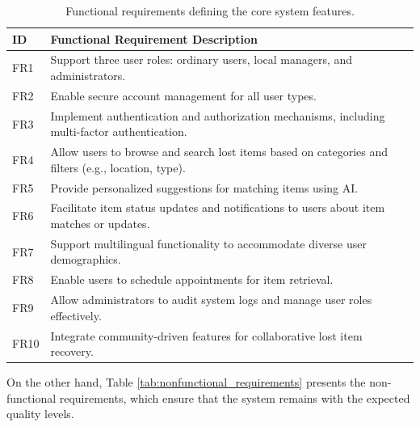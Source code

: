 \begin{table}[!htb]
\centering
\begin{tabular}{|p{}|p{}|}
\hline
\textbf{ID} & \textbf{Functional Requirement Description} \\ \hline
FR1 & Support three user roles: ordinary users, local managers, and administrators. \\ \hline
FR2 & Enable secure account management for all user types. \\ \hline
FR3 & Implement authentication and authorization mechanisms, including multi-factor authentication. \\ \hline
FR4 & Allow users to browse and search lost items based on categories and filters (e.g., location, type). \\ \hline
FR5 & Provide personalized suggestions for matching items using AI. \\ \hline
FR6 & Facilitate item status updates and notifications to users about item matches or updates. \\ \hline
FR7 & Support multilingual functionality to accommodate diverse user demographics. \\ \hline
FR8 & Enable users to schedule appointments for item retrieval. \\ \hline
FR9 & Allow administrators to audit system logs and manage user roles effectively. \\ \hline
FR10 & Integrate community-driven features for collaborative lost item recovery. \\ \hline
\end{tabular}
\caption[Functional Requirements]{Functional requirements defining the core system features.}
\label{tab:functional_requirements}
\end{table}

On the other hand, Table \ref{tab:nonfunctional_requirements} presents the non-functional requirements, which ensure that the system remains with the expected quality levels.

